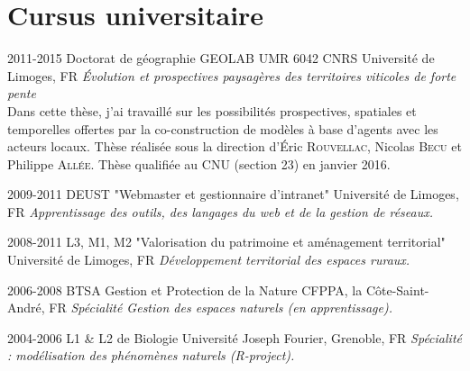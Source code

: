 \documentclass[]{cv-etienne}
\begin{document}
\section{Cursus universitaire}
\begin{entrylist}
  \entry
  {2011-2015}
  {Doctorat de géographie {\normalfont GEOLAB UMR 6042 CNRS}}
  { Université de Limoges, FR}
  {\emph{\'Evolution et prospectives paysagères des territoires viticoles de forte pente} \\Dans cette thèse, j'ai travaillé sur les possibilités prospectives, spatiales et temporelles offertes par la co-construction de modèles à base d'agents avec les acteurs locaux. Thèse réalisée sous la direction d'\'Eric \textsc{Rouvellac}, Nicolas \textsc{Becu} et Philippe \textsc{Allée}. Thèse qualifiée au CNU (section 23) en janvier 2016.}
\end{entrylist}
\begin{entrylist}
  \entry
  {2009-2011}
  {DEUST {\normalfont "Webmaster et gestionnaire d’intranet"}}
  {Université de Limoges, FR}
  {\emph{Apprentissage des outils, des langages du web et de la gestion de réseaux.}}
\end{entrylist}
\begin{entrylist}
  \entry
  {2008-2011}
  {L3, M1, M2 {\normalfont "Valorisation du patrimoine et aménagement territorial"}}
  { Université de Limoges, FR}
  {\emph{Développement territorial des espaces ruraux.}}
\end{entrylist}
\begin{entrylist}
  \entry
  {2006-2008}
  {BTSA {\normalfont Gestion et Protection de la Nature }}
  { CFPPA, la Côte-Saint-André, FR}
  {\emph{Spécialité Gestion des espaces naturels (en apprentissage).}}
\end{entrylist}
\begin{entrylist}
  \entry
  {2004-2006}
  {L1 \& L2 de Biologie}
  { Université Joseph Fourier, Grenoble, FR}
  {\emph{Spécialité : modélisation des phénomènes naturels (R-project).}}
\end{entrylist}
\end{document}
